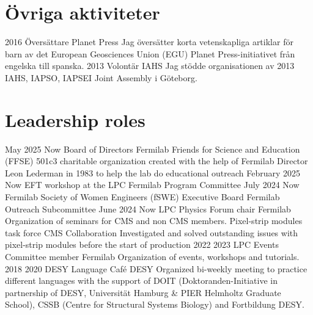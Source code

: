 \ifswedish
  \section{Övriga aktiviteter}
    \position
      {2016 \textemdash{}}
      {Översättare}
      {Planet Press}
      {Jag översätter korta vetenskapliga artiklar för barn av det European Geosciences Union (EGU) Planet Press-initiativet från engelska till spanska.}
    \position
      {2013}
      {Volontär}
      {IAHS}
      {Jag stödde organisationen av 2013 IAHS, IAPSO, IAPSEI Joint Assembly i Göteborg.}
\else
  \section{Leadership roles}
    \position
      {May 2025 \textemdash{} Now} 
      {Board of Directors}
      {Fermilab Friends for Science and Education (FFSE)}
      {501c3 charitable organization created with the help of Fermilab Director Leon Lederman in 1983 to help the lab do educational outreach}
  	\position
      {February 2025 \textemdash{} Now} 
      {EFT workshop at the LPC}
      {Fermilab}
      {Program Committee}
     \position
      {July 2024 \textemdash{} Now} 
      {Fermilab Society of Women Engineers (fSWE) Executive Board}
      {Fermilab}
      {Outreach Subcommittee}
     \position
      {June 2024 \textemdash{} Now} 
      {LPC Physics Forum chair}
      {Fermilab}
      {Organization of seminars for CMS and non CMS members.}
      {Pixel-strip modules task force}
      {CMS Collaboration}
      {Investigated and solved outstanding issues with pixel-strip modules before the start of production}
     \position
      {2022 \textemdash{} 2023} 
      {LPC Events Committee member}
      {Fermilab}
      {Organization of events, workshops and tutorials.}
    \position
      {2018 \textemdash{} 2020} 
      {DESY Language Café}
      {DESY}
      {Organized bi-weekly meeting to practice different languages with the support of DOIT (Doktoranden-Initiative in partnership of DESY, Universität Hamburg \&  PIER Helmholtz Graduate School), CSSB (Centre for Structural Systems Biology) and Fortbildung DESY.}
\fi
